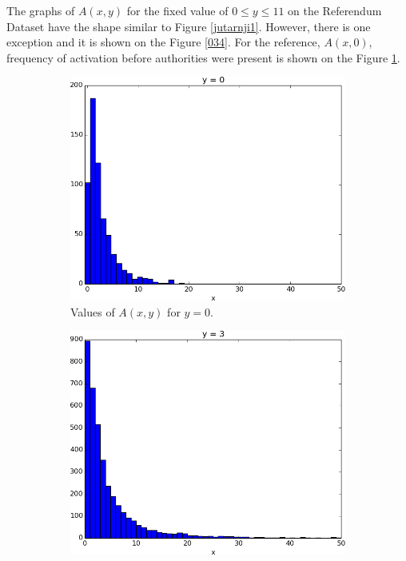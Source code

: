 \documentclass[times, utf8, zavrsni]{fer}
\begin{document}
 The graphs of $A(x,y)$ for the fixed value of $ 0 \le y \leq 11$ on the Referendum Dataset have the shape similar to Figure \ref{jutarnji1}. However, there is one exception and it is shown on the Figure \ref{034}. For the reference,  $A(x, 0)$, frequency of activation  before authorities were present is shown on the Figure \ref{y0}. 
\begin{figure}
\begin{subfigure}{\textwidth}
\centering
\includegraphics[scale=0.4]{figs/y0.png}
\caption{Values of $A(x, y)$ for $y=0$.}
\label{y0}
\end{subfigure}%
\par\bigskip
\begin{subfigure}{\textwidth}
\centering
\includegraphics[scale=0.4]{figs/jutarnji1.png}

\end{subfigure}
\end{figure}
\end{document}
